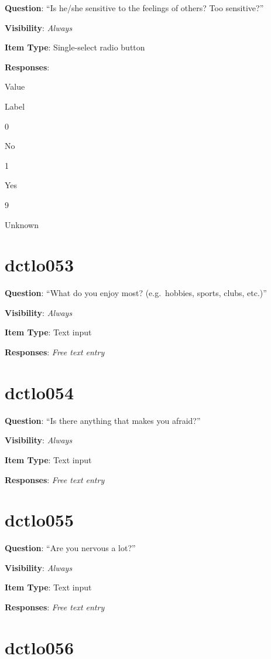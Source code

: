 \documentclass[]{book}
\begin{document}
\textbf{Question}: ``Is he/she sensitive to the feelings of others? Too sensitive?''

\textbf{Visibility}: \emph{Always}

\textbf{Item Type}: Single-select radio button

\textbf{Responses}:

Value

Label

0

No

1

Yes

9

Unknown

\hypertarget{dctlo053}{%
\section{dctlo053}\label{dctlo053}}

\textbf{Question}: ``What do you enjoy most? (e.g.~hobbies, sports, clubs, etc.)''

\textbf{Visibility}: \emph{Always}

\textbf{Item Type}: Text input

\textbf{Responses}: \emph{Free text entry}

\hypertarget{dctlo054}{%
\section{dctlo054}\label{dctlo054}}

\textbf{Question}: ``Is there anything that makes you afraid?''

\textbf{Visibility}: \emph{Always}

\textbf{Item Type}: Text input

\textbf{Responses}: \emph{Free text entry}

\hypertarget{dctlo055}{%
\section{dctlo055}\label{dctlo055}}

\textbf{Question}: ``Are you nervous a lot?''

\textbf{Visibility}: \emph{Always}

\textbf{Item Type}: Text input

\textbf{Responses}: \emph{Free text entry}

\hypertarget{dctlo056}{%
\section{dctlo056}\label{dctlo056}}
\end{document}
